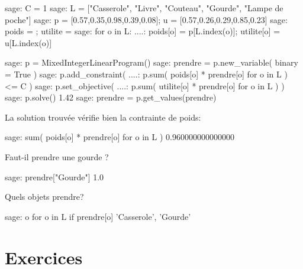 \documentclass[french]{beamer}
\begin{document}
\begin{frame}[fragile]
\begin{pythoncode}
sage: C = 1
sage: L = ["Casserole", "Livre", "Couteau", "Gourde", "Lampe de poche"]
sage: p = [0.57,0.35,0.98,0.39,0.08]; u = [0.57,0.26,0.29,0.85,0.23]
sage: poids = {}; utilite = {}
sage: for o in L:
....:    poids[o] = p[L.index(o)]; utilite[o] = u[L.index(o)]
\end{pythoncode}

  \pause

\begin{pythoncode}
sage: p = MixedIntegerLinearProgram()
sage: prendre = p.new_variable( binary = True )
sage: p.add_constraint(
....:   p.sum( poids[o] * prendre[o] for o in L ) <= C )
sage: p.set_objective(
....:   p.sum( utilite[o] * prendre[o] for o in L ) )
sage: p.solve() 
1.42
sage: prendre = p.get_values(prendre)
\end{pythoncode}


  

\end{frame}


\begin{frame}[fragile]

  La solution trouvée vérifie bien la contrainte de poids:
  
\begin{pythoncode}
  sage: sum( poids[o] * prendre[o] for o in L )
  0.960000000000000
\end{pythoncode}


\pause

Faut-il prendre une gourde ?

\begin{pythoncode}
  sage: prendre["Gourde"]
  1.0
\end{pythoncode}


\pause

Quels objets prendre?

\begin{pythoncode}
sage: {o for o in L if prendre[o]}
{'Casserole', 'Gourde'}
\end{pythoncode}




\end{frame}

\section{Exercices}
\end{document}
